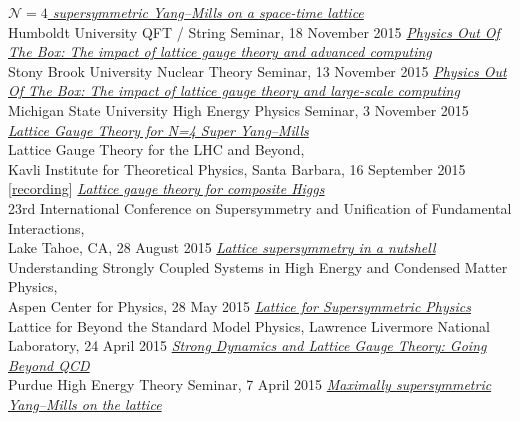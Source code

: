 \begin{spacelist}
\begin{revnumerate}
    \pagebreakitem
      \textit{\href{http://www.davidschaich.net/talks/151118Humboldt.pdf}{$\mathcal N = 4$ supersymmetric Yang--Mills on a space-time lattice}} \\
      Humboldt University QFT / String Seminar, 18 November 2015
    \pagebreakitem
      \textit{\href{http://www.davidschaich.net/talks/1511StonyBrook.pdf}{Physics Out Of The Box: The impact of lattice gauge theory and advanced computing}} \\
      Stony Brook University Nuclear Theory Seminar, 13 November 2015
    \pagebreakitem
      \textit{\href{http://www.davidschaich.net/talks/1511MSU.pdf}{Physics Out Of The Box: The impact of lattice gauge theory and large-scale computing}} \\
      Michigan State University High Energy Physics Seminar, 3 November 2015
    \pagebreakitem
      \textit{\href{http://www.davidschaich.net/talks/1509KITP.pdf}{Lattice Gauge Theory for N=4 Super Yang--Mills}} \\
      Lattice Gauge Theory for the LHC and Beyond, \\ Kavli Institute for Theoretical Physics, Santa Barbara, 16 September 2015 [\href{http://online.kitp.ucsb.edu/online/latticeqcd15/schaich/}{recording}]
    \pagebreakitem
      \textit{\href{http://www.davidschaich.net/talks/LGT4CH.pdf}{Lattice gauge theory for composite Higgs}} \\
      23rd International Conference on Supersymmetry and Unification of Fundamental Interactions, \\ Lake Tahoe, CA, 28 August 2015
    \pagebreakitem
      \textit{\href{http://www.davidschaich.net/talks/Aspen15.pdf}{Lattice supersymmetry in a nutshell}} \\
      Understanding Strongly Coupled Systems in High Energy and Condensed Matter Physics, \\ Aspen Center for Physics, 28 May 2015
    \pagebreakitem
      \textit{\href{http://www.davidschaich.net/talks/Livermore1504.pdf}{Lattice for Supersymmetric Physics}} \\
      Lattice for Beyond the Standard Model Physics, Lawrence Livermore National Laboratory, 24 April 2015
    \pagebreakitem
      \textit{\href{http://www.davidschaich.net/talks/Purdue1504.pdf}{Strong Dynamics and Lattice Gauge Theory: Going Beyond QCD}} \\
      Purdue High Energy Theory Seminar, 7 April 2015
    \pagebreakitem
      \textit{\href{http://www.davidschaich.net/talks/SCGT15.pdf}{Maximally supersymmetric Yang--Mills on the lattice}} \\

\end{revnumerate}
\end{spacelist}

